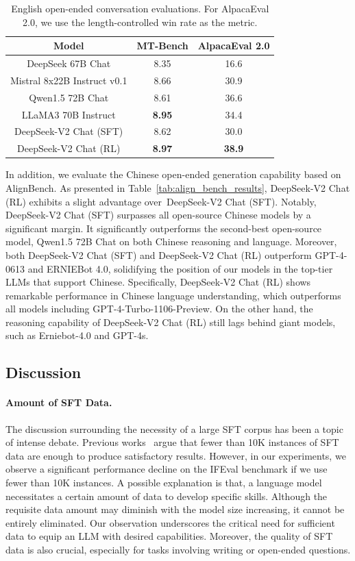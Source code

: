 \documentclass[11pt, a4paper, logo, copyright, nonumbering]{deepseek}
\newcommand{\dsviisft}{DeepSeek-V2 Chat (SFT)}
\newcommand{\dsviirl}{DeepSeek-V2 Chat (RL)}
\begin{document}
\begin{CJK*}{UTF8}{gbsn}
\begin{table}[!t]
    \centering
    \begin{tabular}{c | c c}
    \toprule
    \textbf{Model} & \textbf{MT-Bench} & \textbf{AlpacaEval 2.0} \\
    \midrule
    DeepSeek 67B Chat & 8.35 & 16.6  \\
    Mistral 8x22B Instruct v0.1 & 8.66 & 30.9 \\
    Qwen1.5 72B Chat & 8.61 & 36.6 \\
    LLaMA3 70B Instruct & \textbf{8.95} & 34.4 \\
    \dsviisft & 8.62 & 30.0 \\
    \dsviirl & \textbf{8.97} & \textbf{38.9} \\
    \bottomrule
    \end{tabular}
    \caption{
    English open-ended conversation evaluations. 
    For AlpacaEval 2.0, we use the length-controlled win rate as the metric. 
    }
    \label{tab:open} 
\end{table}

In addition, we evaluate the Chinese open-ended generation capability based on AlignBench. 
As presented in Table~\ref{tab:align_bench_results}, \dsviirl{} exhibits a slight advantage over~\dsviisft{}. 
Notably, \dsviisft{} surpasses all open-source Chinese models by a significant margin. 
It significantly outperforms the second-best open-source model, Qwen1.5 72B Chat on both Chinese reasoning and language. 
Moreover, both \dsviisft{} and \dsviirl{} outperform GPT-4-0613 and ERNIEBot 4.0, solidifying the position of our models in the top-tier LLMs that support Chinese. 
Specifically, \dsviirl{} shows remarkable performance in Chinese language understanding, which outperforms all models including GPT-4-Turbo-1106-Preview. 
On the other hand, the reasoning capability of \dsviirl{} still lags behind giant models, such as Erniebot-4.0 and GPT-4s. 



\subsection{Discussion}

\paragraph{Amount of SFT Data.}
The discussion surrounding the necessity of a large SFT corpus has been a topic of intense debate. 
Previous works~\citep{yi, lima} argue that fewer than 10K instances of SFT data are enough to produce satisfactory results. 
However, in our experiments, we observe a significant performance decline on the IFEval benchmark if we use fewer than 10K instances. 
A possible explanation is that, a language model necessitates a certain amount of data to develop specific skills. 
Although the requisite data amount may diminish with the model size increasing, it cannot be entirely eliminated. 
Our observation underscores the critical need for sufficient data to equip an LLM with desired capabilities. 
Moreover, the quality of SFT data is also crucial, especially for tasks involving writing or open-ended questions. 


\end{CJK*}
\end{document}
